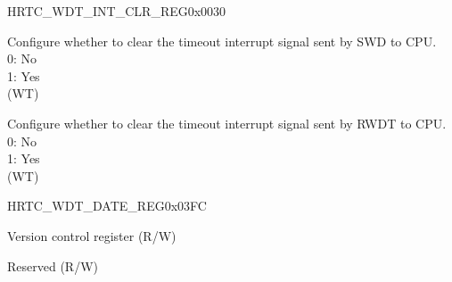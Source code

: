 \begin{register}{H}{RTC\_WDT\_INT\_CLR\_REG}{0x0030}\label{regdesc:RTCWDTINTCLRREG}
%
%
%
\regnewline%
\begin{regdesc}\begin{reglist}
\label{fielddesc:RTCWDTSUPERWDTINTCLR}\item [RTC\_WDT\_SWD\_INT\_CLR] Configure whether to clear the timeout interrupt signal sent by SWD to CPU.\\
0: No \\
1: Yes  \\ (WT)
\label{fielddesc:RTCWDTINTCLR}\item [RTC\_WDT\_INT\_CLR] Configure whether to clear the timeout interrupt signal sent by RWDT to CPU.\\
0: No \\
1: Yes  \\ (WT)
\end{reglist}\end{regdesc}
\end{register}


\begin{register}{H}{RTC\_WDT\_DATE\_REG}{0x03FC}\label{regdesc:RTCWDTDATEREG}
%
%
\regnewline%
\begin{regdesc}\begin{reglist}
\label{fielddesc:RTCWDTDATE}\item [RTC\_WDT\_DATE] Version control register (R/W)
\label{fielddesc:RTCWDTCLKEN}\item [RTC\_WDT\_CLK\_EN] Reserved (R/W)
\end{reglist}\end{regdesc}
\end{register}
